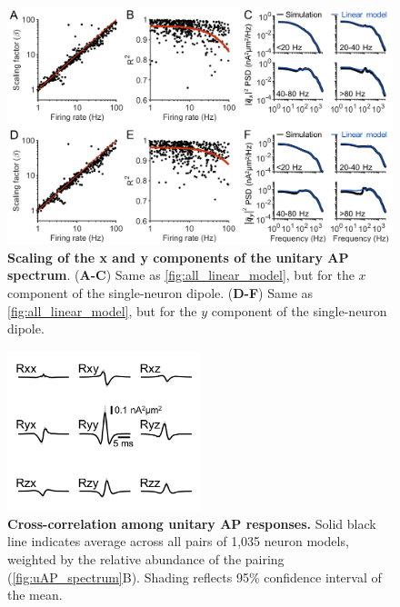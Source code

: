 \begin{figure}[h!]
    \centering
    \includegraphics[width=14cm]{Figures/chapter3/figureS1.png}
    \caption[Scaling of the x and y components of the unitary AP spectrum]{\textbf{Scaling of the x and y components of the unitary AP spectrum}. (\textbf{A-C}) Same as {\autoref{fig:all_linear_model}}, but for the $x$ component of the single-neuron dipole. (\textbf{D-F}) Same as {\autoref{fig:all_linear_model}}, but for the $y$ component of the single-neuron dipole.} 
    \label{fig:linear_model_xy}
\end{figure}

\clearpage

\begin{figure}[h!]
    \centering
    \includegraphics[width=5.6cm]{Figures/chapter3/figureS2.png}
    \caption[Cross-correlation among unitary AP responses]{\textbf{Cross-correlation among unitary AP responses.} Solid black line indicates average across all pairs of 1,035 neuron models, weighted by the relative abundance of the pairing ({\autoref{fig:uAP_spectrum}B}). Shading reflects 95\% confidence interval of the mean.} 
    \label{fig:cross_ap_correlation}
\end{figure}

\clearpage

